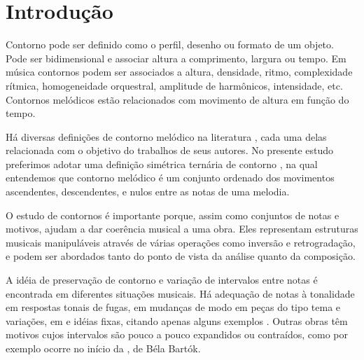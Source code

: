 





\section{Introdução}
\label{sec:introducao}

Contorno pode ser definido como o perfil, desenho ou formato de um
objeto. Pode ser bidimensional e associar altura a comprimento,
largura ou tempo. Em música contornos podem ser associados a altura,
densidade, ritmo, complexidade rítmica, homogeneidade orquestral,
amplitude de harmônicos, intensidade, etc. Contornos melódicos estão
relacionados com movimento de altura em função do tempo.

Há diversas definições de contorno melódico na literatura
\cite{piston59:harmony,toch77:shaping,schonberg:fundamentals,adams76:melodic,marvin.ea87:relating,morris87:composition,clifford95:contour,beard03:contour},
cada uma delas relacionada com o objetivo do trabalhos de seus
autores. No presente estudo preferimos adotar uma definição simétrica
ternária de contorno \cite{polansky.ea92:possible}, na qual entendemos
que contorno melódico é um conjunto ordenado dos movimentos
ascendentes, descendentes, e nulos entre as notas de uma
melodia. 


O estudo de contornos é importante porque, assim como conjuntos de
notas e motivos, ajudam a dar coerência musical a uma obra. Eles
representam estruturas musicais manipuláveis através de várias
operações como inversão e retrogradação, e podem ser abordados tanto
do ponto de vista da análise quanto da composição.

A idéia de preservação de contorno e variação de intervalos entre
notas é encontrada em diferentes situações musicais. Há adequação de
notas à tonalidade em respostas tonais de fugas, em mudanças de modo
em peças do tipo tema e variações, em  e idéias fixas,
citando apenas alguns exemplos
\cite[p. 29]{morris87:composition}. Outras obras têm motivos cujos
intervalos são pouco a pouco expandidos ou contraídos, como por
exemplo ocorre no início da , de Béla Bartók. 

